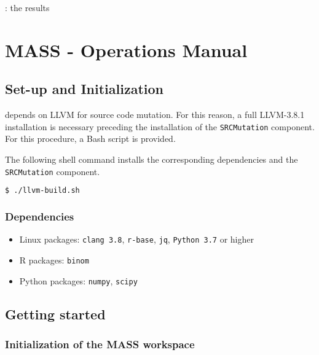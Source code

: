 : the results%

\chapter{MASS - Operations Manual}

\section{Set-up and Initialization}
\label{sec:install}

\MASS depends on LLVM for source code mutation. For this reason, a full LLVM-3.8.1 installation is necessary preceding the installation of the \texttt{SRCMutation} component. For this procedure, a Bash script is provided.

The following shell command installs the corresponding dependencies and the \texttt{SRCMutation} component.

\begin{lstlisting}[language=bash]
  $ ./llvm-build.sh
\end{lstlisting}

\subsection{Dependencies}


\begin{itemize}
	\item Linux packages: \texttt{clang 3.8}, \texttt{r-base}, \texttt{jq}, \texttt{Python 3.7} or higher
	\item R packages: \texttt{binom}
	\item Python packages: \texttt{numpy}, \texttt{scipy}
\end{itemize}


\section{Getting started}

\subsection{Initialization of the MASS workspace}


